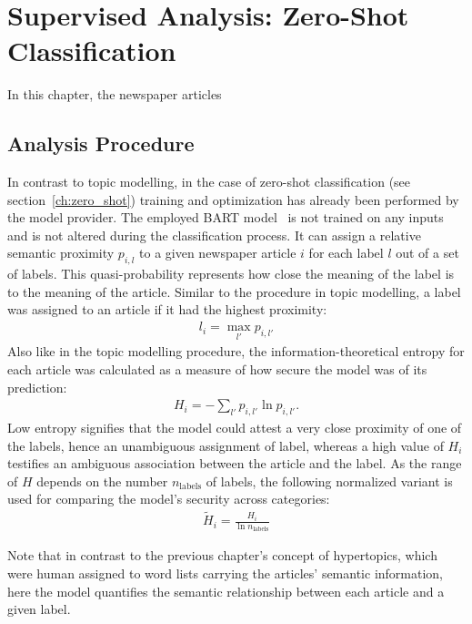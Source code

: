\renewcommand{\imagepath}{../70-supervised/img}

\chapter{Supervised Analysis: Zero-Shot Classification}\label{ch:supervised}
In this chapter, the newspaper articles 

\section{Analysis Procedure}
In contrast to topic modelling, in the case of zero-shot classification (see section~\ref{ch:zero_shot}) training and optimization has already been performed by the model provider. The employed BART model~\autocite{lewis_bart_2020}  is not trained on any inputs and is not altered during the classification process. It can assign a relative semantic proximity $p_{i, l}$ to a given newspaper article $i$ for each label $l$ out of a set of labels. This quasi-probability represents how close the meaning of the label is to the meaning of the article. Similar to the procedure in topic modelling, a label was assigned to an article if it had the highest proximity:
\begin{align}
    l_{i} = \max_{l'} p_{i, l'}
\end{align}
Also like in the topic modelling procedure, the information-theoretical entropy \autocite{gray_entropy_2013} for each article was calculated as a measure of how secure the model was of its prediction:
\begin{align}
    H_i = -\sum_{l'} p_{i, l'} \ln p_{i, l'}.
\end{align}
Low entropy signifies that the model could attest a very close proximity of one of the labels, hence an unambiguous assignment of label, whereas a high value of $H_i$ testifies an ambiguous association between the article and the label. As the range of $H$ depends on the number $n_\text{labels}$ of labels, the following normalized variant is used for comparing the model's security across categories:
\begin{align}
    \widetilde{H}_i = \frac{H_i}{\ln n_\text{labels}}
\end{align}

Note that in contrast to the previous chapter's concept of hypertopics, which were human assigned to word lists carrying the articles' semantic information, here the model quantifies the semantic relationship between each article and a given label.

